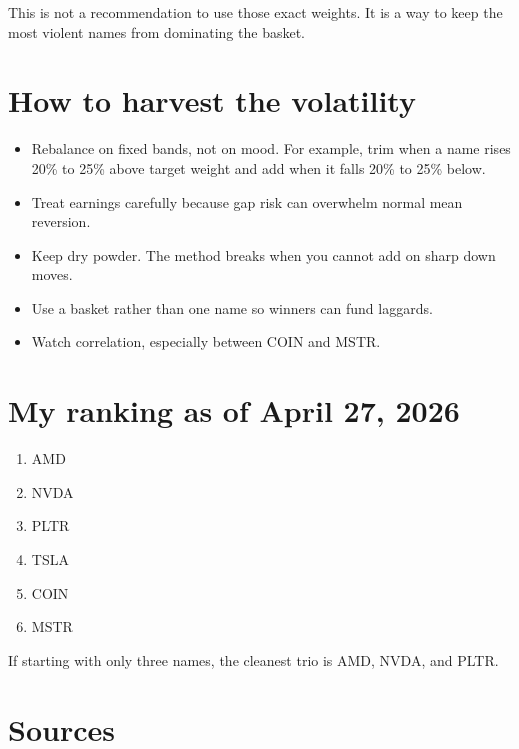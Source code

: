 \documentclass[11pt]{article}
\begin{document}
This is not a recommendation to use those exact weights. It is a way to keep the most violent names from dominating the basket.

\section*{How to harvest the volatility}

\begin{itemize}
  \item Rebalance on fixed bands, not on mood. For example, trim when a name rises 20\% to 25\% above target weight and add when it falls 20\% to 25\% below.
  \item Treat earnings carefully because gap risk can overwhelm normal mean reversion.
  \item Keep dry powder. The method breaks when you cannot add on sharp down moves.
  \item Use a basket rather than one name so winners can fund laggards.
  \item Watch correlation, especially between COIN and MSTR.
\end{itemize}

\section*{My ranking as of April 27, 2026}

\begin{enumerate}
  \item AMD
  \item NVDA
  \item PLTR
  \item TSLA
  \item COIN
  \item MSTR
\end{enumerate}

If starting with only three names, the cleanest trio is AMD, NVDA, and PLTR.

\section*{Sources}
\end{document}
